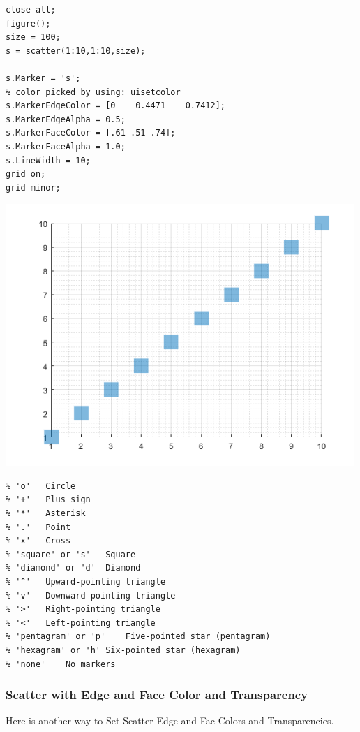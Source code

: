 \documentclass[
]{book}
\begin{document}
\begin{verbatim}
close all;
figure();
size = 100;
s = scatter(1:10,1:10,size);

s.Marker = 's';
% color picked by using: uisetcolor
s.MarkerEdgeColor = [0    0.4471    0.7412];
s.MarkerEdgeAlpha = 0.5;
s.MarkerFaceColor = [.61 .51 .74];
s.MarkerFaceAlpha = 1.0;
s.LineWidth = 10;
grid on;
grid minor;
\end{verbatim}

\includegraphics[width=5.20833in,height=\textheight]{img/fs_scatter_images/figure_0.png}

\begin{verbatim}
% 'o'   Circle
% '+'   Plus sign
% '*'   Asterisk
% '.'   Point
% 'x'   Cross
% 'square' or 's'   Square
% 'diamond' or 'd'  Diamond
% '^'   Upward-pointing triangle
% 'v'   Downward-pointing triangle
% '>'   Right-pointing triangle
% '<'   Left-pointing triangle
% 'pentagram' or 'p'    Five-pointed star (pentagram)
% 'hexagram' or 'h' Six-pointed star (hexagram)
% 'none'    No markers
\end{verbatim}

\hypertarget{scatter-with-edge-and-face-color-and-transparency}{%
\subsubsection{Scatter with Edge and Face Color and Transparency}\label{scatter-with-edge-and-face-color-and-transparency}}

Here is another way to Set Scatter Edge and Fac Colors and
Transparencies.
\end{document}
